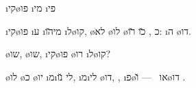 \i{קי}\o{פו}
 \i{מי} \i{פי}

  \i{קי}\o{פו}
\i{ע} \i{מי}\u{הו} \i{ל}\o{קו},
 \o{לא}  \o{לו} \o{כ} ,
\u{כו} \u{רו}: \i{ה} \o{דו}.

 \o{שו},  \o{שו},
\i{קי}\o{פו} \o{רו} \i{ל}\o{קו}?

  \o{לו} \o{כ} \o{יו}
\i{מ}\i{לי} \u{נו}\gnuva {}, \i{מ}\i{לי} \o{דו},
 , \i{פ}\o{או} ~—
\u{ו}\o{דו} .
